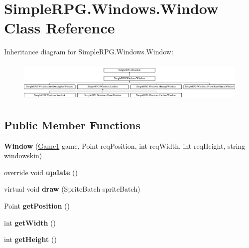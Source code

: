\hypertarget{class_simple_r_p_g_1_1_windows_1_1_window}{\section{Simple\+R\+P\+G.\+Windows.\+Window Class Reference}
\label{class_simple_r_p_g_1_1_windows_1_1_window}
}
Inheritance diagram for Simple\+R\+P\+G.\+Windows.\+Window\+:\begin{figure}[H]
\begin{center}
\leavevmode
\includegraphics[height=1.958042cm]{class_simple_r_p_g_1_1_windows_1_1_window}
\end{center}
\end{figure}
\subsection*{Public Member Functions}
\begin{DoxyCompactItemize}
\item 
\hypertarget{class_simple_r_p_g_1_1_windows_1_1_window_a77106c03483ec65f3b86d1480f12c5f2}{{\bfseries Window} (\hyperlink{class_simple_r_p_g_1_1_game1}{Game1} game, Point req\+Position, int req\+Width, int req\+Height, string windowskin)}\label{class_simple_r_p_g_1_1_windows_1_1_window_a77106c03483ec65f3b86d1480f12c5f2}

\item 
\hypertarget{class_simple_r_p_g_1_1_windows_1_1_window_a341437b329d28975706528c71edb846f}{override void {\bfseries update} ()}\label{class_simple_r_p_g_1_1_windows_1_1_window_a341437b329d28975706528c71edb846f}

\item 
\hypertarget{class_simple_r_p_g_1_1_windows_1_1_window_ab004ffc0a399c5185085834457f22f0a}{virtual void {\bfseries draw} (Sprite\+Batch sprite\+Batch)}\label{class_simple_r_p_g_1_1_windows_1_1_window_ab004ffc0a399c5185085834457f22f0a}

\item 
\hypertarget{class_simple_r_p_g_1_1_windows_1_1_window_a83b744056d9d1eb19942c265fe2d6c2c}{Point {\bfseries get\+Position} ()}\label{class_simple_r_p_g_1_1_windows_1_1_window_a83b744056d9d1eb19942c265fe2d6c2c}

\item 
\hypertarget{class_simple_r_p_g_1_1_windows_1_1_window_a0d512f21515452828d606cb51a7116f9}{int {\bfseries get\+Width} ()}\label{class_simple_r_p_g_1_1_windows_1_1_window_a0d512f21515452828d606cb51a7116f9}

\item 
\hypertarget{class_simple_r_p_g_1_1_windows_1_1_window_af56ab67ac135f8cf5d664507b1e5c3d9}{int {\bfseries get\+Height} ()}\label{class_simple_r_p_g_1_1_windows_1_1_window_af56ab67ac135f8cf5d664507b1e5c3d9}

\end{DoxyCompactItemize}
